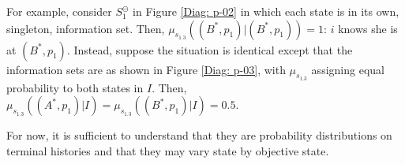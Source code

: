 \documentclass[
11pt,
titlepage,
reqno,
]{article}%
\theoremstyle{definition}
\begin{document}
For example, consider $S^\ominus_1$ in Figure \ref{Diag: p-02} in which each state is in its own, singleton, information set.
Then,  $\mu_{s_{1.3}}((B^\ast,p_1)|(B^\ast,p_1))=1$: $i$ knows she is at $(B^\ast,p_1)$.
Instead, suppose the situation is identical except that the information sets are as shown in Figure \ref{Diag: p-03}, with $\mu_{s_{1.3}}$ assigning equal probability to both states in $I$.
Then, $\mu_{s_{1.3}}((A^\ast,p_1)|I)=\mu_{s_{1.3}}((B^\ast,p_1)|I)=0.5$.

For now, it is sufficient to understand that they are probability distributions on terminal histories and that they may vary state by objective state.

%	
%	
\end{document}
